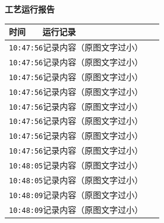 \documentclass[UTF8,10pt,a4paper,fontset=fandol]{ctexart}
\newcommand{\fieldvalue}[1]{#1}
\begin{document}
\noindent
\begin{minipage}[t]{0.48\linewidth}
\centering
\textbf{工艺运行报告}

\small
\begin{tabular}{|p{0.20\linewidth}|p{0.72\linewidth}|}
\hline
时间 & 运行记录\\ \hline
\multicolumn{2}{|l|}{
\fieldvalue{\texttt{10:47:56}\quad 记录内容（原图文字过小）}} \\ \hline
\multicolumn{2}{|l|}{
\fieldvalue{\texttt{10:47:56}\quad 记录内容（原图文字过小）}} \\ \hline
\multicolumn{2}{|l|}{
\fieldvalue{\texttt{10:47:56}\quad 记录内容（原图文字过小）}} \\ \hline
\multicolumn{2}{|l|}{
\fieldvalue{\texttt{10:47:56}\quad 记录内容（原图文字过小）}} \\ \hline
\multicolumn{2}{|l|}{
\fieldvalue{\texttt{10:47:56}\quad 记录内容（原图文字过小）}} \\ \hline
\multicolumn{2}{|l|}{
\fieldvalue{\texttt{10:47:56}\quad 记录内容（原图文字过小）}} \\ \hline
\multicolumn{2}{|l|}{
\fieldvalue{\texttt{10:47:56}\quad 记录内容（原图文字过小）}} \\ \hline
\multicolumn{2}{|l|}{
\fieldvalue{\texttt{10:47:56}\quad 记录内容（原图文字过小）}} \\ \hline
\multicolumn{2}{|l|}{
\fieldvalue{\texttt{10:48:05}\quad 记录内容（原图文字过小）}} \\ \hline
\multicolumn{2}{|l|}{
\fieldvalue{\texttt{10:48:05}\quad 记录内容（原图文字过小）}} \\ \hline
\multicolumn{2}{|l|}{
\fieldvalue{\texttt{10:48:09}\quad 记录内容（原图文字过小）}} \\ \hline
\multicolumn{2}{|l|}{
\fieldvalue{\texttt{10:48:09}\quad 记录内容（原图文字过小）}} \\ \hline

\end{tabular}
\end{minipage}
\end{document}
